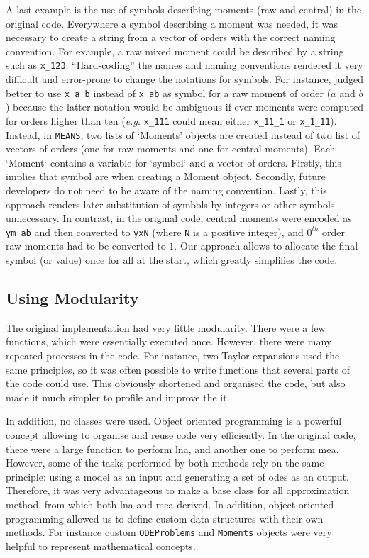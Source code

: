 \documentclass[11pt,a4paper]{article}
\newcommand{\means}{\texttt{MEANS}}
\newcommand{\eg}{\emph{e.g.}}
\begin{document}
A last example is the use of symbols describing moments (raw and central) in the original code.
Everywhere a symbol describing a moment was needed, it was necessary to create a string from a vector of orders with the correct naming convention.
For example, a raw mixed moment could be described by a string such as \verb"x_123".
``Hard-coding'' the names and naming conventions rendered it very difficult and error-prone to change the notations for symbols.
For instance, judged better to use \verb"x_a_b" instead of \verb"x_ab" as symbol for a raw moment of order ($a$ and $b$)
because the latter notation would be ambiguous if ever moments were computed for orders higher than ten (\eg{} \verb"x_111" could mean either \verb"x_11_1"  or \verb"x_1_11").
Instead, in \means, two lists of `Moments' objects are created instead of two list of vectors of orders (one for raw moments and one for central moments).
Each `Moment` contains a variable for `symbol` and a vector of orders.
Firstly, this implies that symbol are when creating a Moment object.
Secondly, future developers do not need to be aware of the naming convention.
Lastly, this approach renders later substitution of symbols by integers or other symbols unnecessary.
In contrast, in the original code, central moments were encoded as \verb"ym_ab" and then
converted to \verb"yxN" (where \verb"N"  is a positive integer),
and $0^{th}$ order raw moments had to be converted to $1$.
Our approach allows to allocate the final symbol (or value) once for all at the start, which greatly simplifies the code.

\subsection{Using Modularity}

The original implementation had very little modularity.
There were a few functions, which were essentially executed once.
However, there were many repeated processes in the code.
For instance, two Taylor expansions used the same principles,
so it was often possible to write functions that several parts of the code could use.
This obviously shortened and organised the code, but also made it much simpler to profile and improve the it.
 
In addition, no classes were used.
Object oriented programming is a powerful concept allowing to organise and reuse code very efficiently.
In the original code, there were a large function to perform \gls{lna}, and another one to perform \gls{mea}.
However, some of the tasks performed by both methods rely on the same principle: using a model as an input and generating a set of \glspl{ode} as an output.
Therefore, it was very advantageous to make a base class for all approximation method, from which both \gls{lna} and \gls{mea} derived.
In addition, object oriented programming allowed us to define custom data structures with their own methods.
For instance custom \texttt{ODEProblems} and \texttt{Moments} objects were very helpful to represent mathematical concepts.
\end{document}
